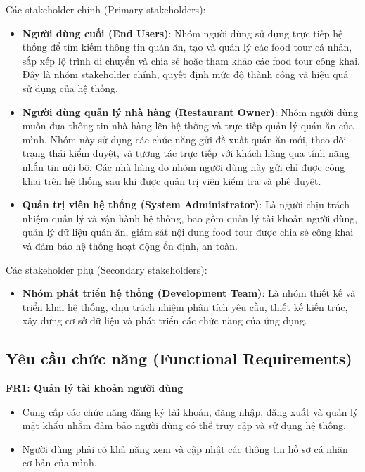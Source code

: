 Các stakeholder chính (Primary stakeholders):
\begin{itemize}[label=\textbullet]
    \item \textbf{Người dùng cuối (End Users)}: Nhóm người dùng sử dụng trực tiếp hệ thống để tìm kiếm thông tin quán ăn, tạo và quản lý các food tour cá nhân, sắp xếp lộ trình di chuyển và chia sẻ hoặc tham khảo các food tour công khai. Đây là nhóm stakeholder chính, quyết định mức độ thành công và hiệu quả sử dụng của hệ thống.
    \item \textbf{Người dùng quản lý nhà hàng (Restaurant Owner)}:
    Nhóm người dùng muốn đưa thông tin nhà hàng lên hệ thống và trực tiếp quản lý quán ăn của mình.
    Nhóm này sử dụng các chức năng gửi đề xuất quán ăn mới, theo dõi trạng thái kiểm duyệt, và tương tác
    trực tiếp với khách hàng qua tính năng nhắn tin nội bộ.  
    Các nhà hàng do nhóm người dùng này gửi chỉ được công khai trên hệ thống
    sau khi được quản trị viên kiểm tra và phê duyệt.
    \item \textbf{Quản trị viên hệ thống (System Administrator)}:
Là người chịu trách nhiệm quản lý và vận hành hệ thống, bao gồm quản lý tài khoản người dùng,
quản lý dữ liệu quán ăn, giám sát nội dung food tour được chia sẻ công khai và đảm bảo hệ thống hoạt động ổn định, an toàn.
\end{itemize}

Các stakeholder phụ (Secondary stakeholders): 

\begin{itemize}[label=\textbullet]
    \item \textbf{Nhóm phát triển hệ thống (Development Team)}: Là nhóm thiết kế và triển khai hệ thống, chịu trách nhiệm phân tích yêu cầu, thiết kế kiến trúc, xây dựng cơ sở dữ liệu và phát triển các chức năng của ứng dụng.
\end{itemize}



\subsection{Yêu cầu chức năng (Functional Requirements)}
\textbf{FR1: Quản lý tài khoản người dùng}
\begin{itemize}[label=\textbullet]
    \item Cung cấp các chức năng đăng ký tài khoản, đăng nhập, đăng xuất và quản lý mật khẩu
nhằm đảm bảo người dùng có thể truy cập và sử dụng hệ thống.
    \item Người dùng phải có khả năng xem và cập nhật các thông tin hồ sơ cá nhân cơ bản của mình.
\end{itemize}

